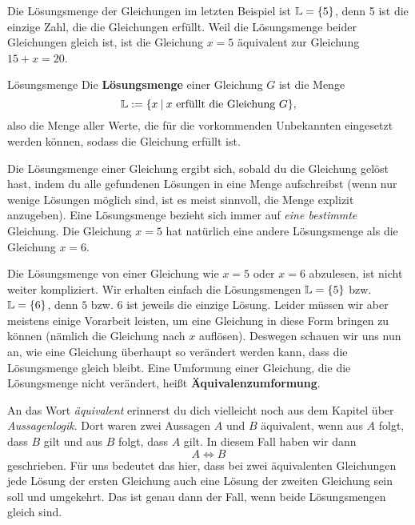 \documentclass[../../main.tex]{subfiles}
\begin{document}
\begin{example}{}
    Die Lösungsmenge der Gleichungen im letzten Beispiel ist $\mathbb{L}=\{5\}$, denn 5 ist die einzige Zahl, die die Gleichungen erfüllt. Weil die Lösungsmenge beider Gleichungen gleich ist, ist die Gleichung $x=5$ äquivalent zur Gleichung $15+x=20$.
\end{example}

\begin{definition}{Lösungsmenge}
    Die \textbf{Lösungsmenge} einer Gleichung $G$ ist die Menge 
    \[\mathbb{L}:=\{x\:|\:x~\text{erfüllt die Gleichung~}G\},\]
    also die Menge aller Werte, die für die vorkommenden Unbekannten eingesetzt werden können, sodass die Gleichung erfüllt ist.
\end{definition}

Die Lösungsmenge einer Gleichung ergibt sich, sobald du die Gleichung gelöst hast, indem du alle gefundenen Lösungen in eine Menge aufschreibst (wenn nur wenige Lösungen möglich sind, ist es meist sinnvoll, die Menge explizit anzugeben). Eine Lösungsmenge bezieht sich immer auf \emph{eine bestimmte} Gleichung. Die Gleichung $x=5$ hat natürlich eine andere Lösungsmenge als die Gleichung $x=6$.

Die Lösungsmenge von einer Gleichung wie $x=5$ oder $x=6$ abzulesen, ist nicht weiter kompliziert. Wir erhalten einfach die Lösungsmengen $\mathbb{L}=\{5\}$ bzw. $\mathbb{L}=\{6\}$, denn $5$ bzw. $6$ ist jeweils die einzige Lösung. Leider müssen wir aber meistens einige Vorarbeit leisten, um eine Gleichung in diese Form bringen zu können (nämlich die Gleichung nach $x$ auflösen). Deswegen schauen wir uns nun an, wie eine Gleichung überhaupt so verändert werden kann, dass die Lösungsmenge gleich bleibt. Eine Umformung einer Gleichung, die die Lösungsmenge nicht verändert, heißt \textbf{Äquivalenzumformung}.

An das Wort \emph{äquivalent} erinnerst du dich vielleicht noch aus dem Kapitel über \emph{Aussagenlogik}. Dort waren zwei Aussagen $A$ und $B$ äquivalent, wenn aus $A$ folgt, dass $B$ gilt und aus $B$ folgt, dass $A$ gilt. In diesem Fall haben wir dann
\[A\iff B\]
geschrieben. Für uns bedeutet das hier, dass bei zwei äquivalenten Gleichungen jede Lösung der ersten Gleichung auch eine Lösung der zweiten Gleichung sein soll und umgekehrt. Das ist genau dann der Fall, wenn beide Lösungsmengen gleich sind.
\end{document}
